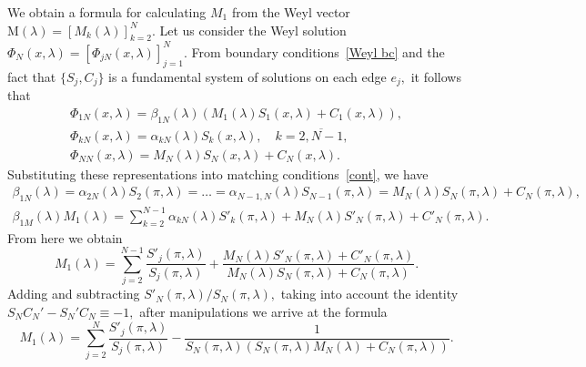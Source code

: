 \documentclass[a4paper, 12pt] {article}
\theoremstyle{plain}
\theoremstyle{remark}
\theoremstyle{plain}
\theoremstyle{definition}
\numberwithin{equation}{section}
\begin{document}
We obtain a formula for calculating $M_1$ from the Weyl vector $\mathrm{M}(\lambda)=[M_k(\lambda)]_{k=2}^N.$
Let us consider the Weyl solution $\Phi_N(x, \lambda) = [\Phi_{jN}(x, \lambda)]_{j=1}^N.$
From boundary conditions~\eqref{Weyl bc} and the fact that $\{ S_j, C_j \}$ is a fundamental system of solutions on each edge $e_j,$ it follows that
\begin{equation*}
\begin{split}
 \Phi_{1N}(x, \lambda) = \beta_{1N}(\lambda)(M_1(\lambda) S_1(x, \lambda)  + C_1(x, \lambda)), \\
\Phi_{kN}(x, \lambda) = \alpha_{kN}(\lambda) S_k(x, \lambda), \quad k=\overline{2, N-1},\\
\Phi_{NN}(x, \lambda) = M_N(\lambda) S_N(x, \lambda)+C_N(x, \lambda).
\end{split}
\end{equation*}
Substituting these representations into matching conditions~\eqref{cont}, we have
\begin{equation*}
\begin{split}
\beta_{1N}(\lambda) = \alpha_{2N}(\lambda)S_2(\pi, \lambda) = \ldots =  \alpha_{N-1,N}(\lambda)S_{N-1}(\pi, \lambda) = M_N(\lambda) S_N(\pi, \lambda)+C_N(\pi, \lambda),\\
\beta_{1M}(\lambda) M_1(\lambda) = \sum_{k=2}^{N-1} \alpha_{kN}(\lambda)S'_k(\pi, \lambda) + M_N(\lambda) S'_N(\pi, \lambda)+C'_N(\pi, \lambda).
\end{split}
\end{equation*}
From here we obtain
$$M_1(\lambda) = \sum_{j=2}^{N-1} \frac{S'_j(\pi, \lambda)}{S_j(\pi, \lambda)} + \frac{M_N(\lambda) S'_N(\pi, \lambda)+C'_N(\pi, \lambda)}{M_N(\lambda) S_N(\pi, \lambda)+C_N(\pi, \lambda)}.$$
Adding and subtracting $S'_N(\pi, \lambda)/S_N(\pi, \lambda),$  taking into account the identity $S_N C_N' - S_N' C_N \equiv -1,$ after manipulations we arrive at the formula
\begin{equation} \label{M_1 comp}
M_1(\lambda) = \sum_{j=2}^N \frac{S'_j(\pi, \lambda)}{S_j(\pi, \lambda)} - \frac{1}{S_N(\pi, \lambda)(S_N(\pi, \lambda)M_N(\lambda) + C_N(\pi, \lambda))}.\end{equation}
\end{document}
